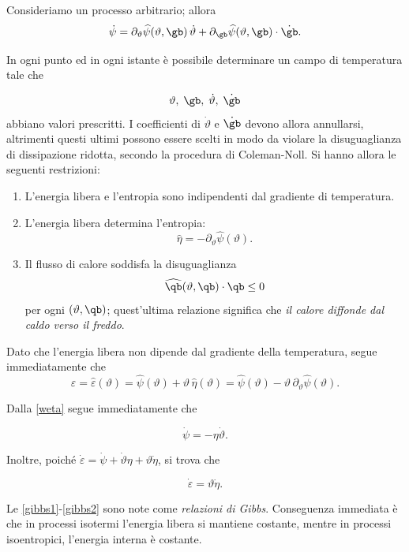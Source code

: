 Consideriamo un processo arbitrario; allora
\begin{equation}
	\dot{\psi}=\partial_\vartheta\widehat{\psi}(\vartheta,\gb)\,\dot{\vartheta}+\partial_\gb\widehat{\psi}(\vartheta,\gb)\cdot\dot{\gb}.
\end{equation}

In ogni punto ed in ogni istante è possibile determinare un campo di temperatura tale che 

\begin{equation}
\vartheta, \; \gb, \; \dot{\vartheta}, \; \dot{\gb}
\end{equation}
abbiano valori prescritti. I coefficienti di $\dot{\vartheta}$ e $\dot{\gb}$ devono allora annullarsi, altrimenti questi ultimi possono essere scelti in modo da violare la disuguaglianza di dissipazione ridotta, secondo la procedura di Coleman-Noll. Si hanno allora le seguenti restrizioni:
\begin{enumerate}
	\item L'energia libera e l'entropia sono indipendenti dal gradiente di temperatura.
	\item L'energia libera determina l'entropia:
	\begin{equation}\label{weta}
	\widehat{\eta}=-\partial_\vartheta\widehat{\psi}(\vartheta).
		\end{equation}
	\item Il flusso di calore soddisfa la disuguaglianza
	\begin{equation}\label{diseq}
	\widehat{\qb}(\vartheta, \qb)\cdot\qb\leq 0
	\end{equation}
per ogni $(\vartheta, \qb)$; quest'ultima relazione significa che \textit{il calore diffonde dal caldo verso il freddo}.
\end{enumerate}

Dato che l'energia libera non dipende dal gradiente della temperatura, segue immediatamente che
\begin{equation}\label{epsth}
\varepsilon=\widehat{\varepsilon}(\vartheta)=\widehat{\psi}(\vartheta)+\vartheta\,\widehat{\eta}(\vartheta)=\widehat{\psi}(\vartheta)-\vartheta\,\partial_\vartheta\widehat{\psi}(\vartheta).
\end{equation}

Dalla \eqref{weta} segue immediatamente che 
\begin{definition}
	\begin{equation}\label{gibbs1}
\dot{\psi}=-\eta \dot{\vartheta}.
\end{equation}
\end{definition}
Inoltre, poiché $\dot \varepsilon=\dot\psi+\dot\vartheta \eta+\vartheta\dot \eta$, si trova che
\begin{definition}
	\begin{equation}\label{gibbs2}
\dot\varepsilon=\vartheta\dot{\eta}.
\end{equation}
\end{definition}
Le \eqref{gibbs1}-\eqref{gibbs2} sono note come \textit{relazioni di Gibbs}. Conseguenza immediata è che in processi isotermi l'energia libera si mantiene costante, mentre in processi isoentropici, l'energia interna è costante.

